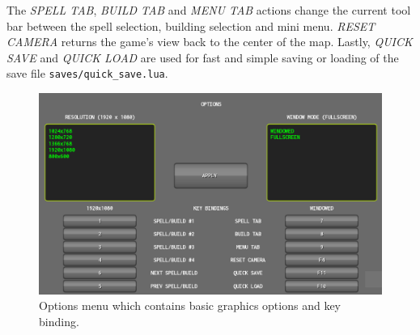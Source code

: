 The \emph{SPELL TAB}, \emph{BUILD TAB} and \emph{MENU TAB} actions change the current tool bar between the spell selection, building
selection and mini menu. \emph{RESET CAMERA} returns the game's view back to the center of the map. Lastly, \emph{QUICK SAVE} and
\emph{QUICK LOAD} are used for fast and simple saving or loading of the save file \texttt{saves/quick\_save.lua}.

\begin{figure}[H]
    \centering
    \includegraphics[width=\textwidth]{../img/gui-options.png}
    \caption{Options menu which contains basic graphics options and key binding.}
    \label{gui-options}
\end{figure}
